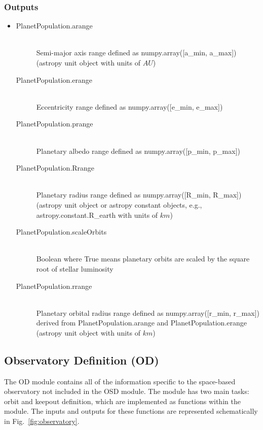 \documentclass[cleanfoot]{asme2ej}
\begin{document}
\subsubsection*{Outputs}
\begin{itemize}
    \item
    \begin{description}
        \item[PlanetPopulation.arange] \hfill \\
        Semi-major axis range defined as numpy.array([a\_min, a\_max]) (astropy unit object with units of $ AU $)
        \item[PlanetPopulation.erange] \hfill \\
        Eccentricity range defined as numpy.array([e\_min, e\_max])
        \item[PlanetPopulation.prange] \hfill \\
        Planetary albedo range defined as numpy.array([p\_min, p\_max])
        \item[PlanetPopulation.Rrange] \hfill \\
        Planetary radius range defined as numpy.array([R\_min, R\_max]) (astropy unit object or astropy constant objects, e.g., astropy.constant.R\_earth with units of $ km $)
        \item[PlanetPopulation.scaleOrbits] \hfill \\
        Boolean where True means planetary orbits are scaled by the square root of stellar luminosity
        \item[PlanetPopulation.rrange] \hfill \\
        Planetary orbital radius range defined as numpy.array([r\_min, r\_max]) derived from PlanetPopulation.arange and PlanetPopulation.erange (astropy unit object with units of $ km $)
    \end{description}
\end{itemize}


\subsection{Observatory Definition (OD)}
The OD module contains all of the information specific to the space-based observatory not included in the OSD module. The module has two main tasks: orbit and keepout definition, which are implemented as functions within the module. The inputs and outputs for these functions are represented schematically in Fig.~\ref{fig:observatory}.
\end{document}
